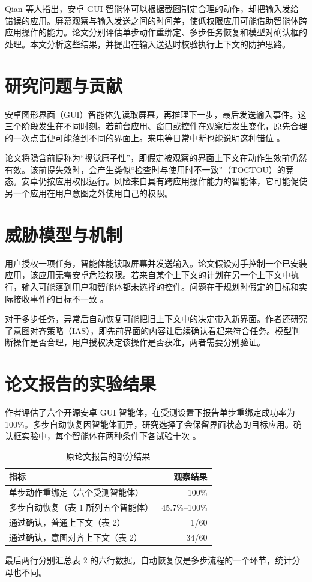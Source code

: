 \documentclass[11pt,a4paper,twoside]{article}
\begin{document}
\makereadingtitle
\begin{readingabstract}
Qian 等人指出，安卓 GUI 智能体可以根据截图制定合理的动作，却把输入发给错误的应用。屏幕观察与输入发送之间的时间差，使低权限应用可能借助智能体跨应用操作的能力。论文分别评估单步动作重绑定、多步任务恢复和模型对确认框的处理。本文分析这些结果，并提出在输入送达时校验执行上下文的防护思路。
\end{readingabstract}

\section{研究问题与贡献}
安卓图形界面（GUI）智能体先读取屏幕，再推理下一步，最后发送输入事件。这三个阶段发生在不同时刻。若前台应用、窗口或控件在观察后发生变化，原先合理的一次点击便可能落到不同的界面上。来电等日常中断也能说明这种错位 \citep[图~1 和第~4~节]{qian2026}。

论文将隐含前提称为“视觉原子性”，即假定被观察的界面上下文在动作生效前仍然有效。该前提失效时，会产生类似“检查时与使用时不一致”（TOCTOU）的竞态。安卓仍按应用权限运行。风险来自具有跨应用操作能力的智能体，它可能促使另一个应用在用户意图之外使用自己的权限。

\section{威胁模型与机制}
用户授权一项任务，智能体能读取屏幕并发送输入。论文假设对手控制一个已安装应用，该应用无需安卓危险权限。若来自某个上下文的计划在另一个上下文中执行，输入可能落到用户和智能体都未选择的控件。问题在于规划时假定的目标和实际接收事件的目标不一致 \citep[第~3--6~节]{qian2026}。

对于多步任务，异常后自动恢复可能把旧上下文中的决定带入新界面。作者还研究了意图对齐策略（IAS），即先前界面的内容让后续确认看起来符合任务。模型判断操作是否合理，用户授权决定该操作是否获准，两者需要分别验证。

\section{论文报告的实验结果}
作者评估了六个开源安卓 GUI 智能体，在受测设置下报告单步重绑定成功率为 100\%。多步自动恢复因智能体而异，研究选择了会保留界面状态的目标应用。确认框实验中，每个智能体在两种条件下各试验十次 \citep[第~7~节、表~1 和表~2]{qian2026}。

\begin{table}[!ht]
\centering\small
\caption{原论文报告的部分结果}
\begin{tabularx}{\linewidth}{@{}Xr@{}}
\toprule
指标 & 观察结果 \\
\midrule
单步动作重绑定（六个受测智能体） & 100\% \\
多步自动恢复（表 1 所列五个智能体） & 45.7\%--100\% \\
通过确认，普通上下文（表 2） & 1/60 \\
通过确认，意图对齐上下文（表 2） & 34/60 \\
\bottomrule
\end{tabularx}
\par\vspace{3pt}
{\footnotesize 最后两行分别汇总表 2 的六行数据。自动恢复仅是多步流程的一个环节，统计分母也不同。}
\end{table}
\end{document}
